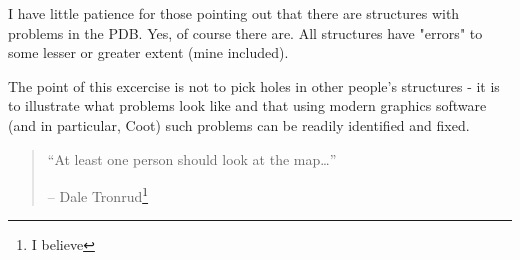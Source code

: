 \documentclass{article}
\begin{document}
I have little patience for those pointing out that there are
structures with problems in the PDB. Yes, of course there are. All
structures have "errors" to some lesser or greater extent (mine
included).

The point of this excercise is not to pick holes in other people's
structures - it is to illustrate what problems look like and that
using modern graphics software (and in particular, Coot) such problems
can be readily identified and fixed.


\begin{quotation}
  ``At least one person should look at the map\ldots'' 

  -- Dale Tronrud\footnote{I believe}
\end{quotation}
\end{document}
